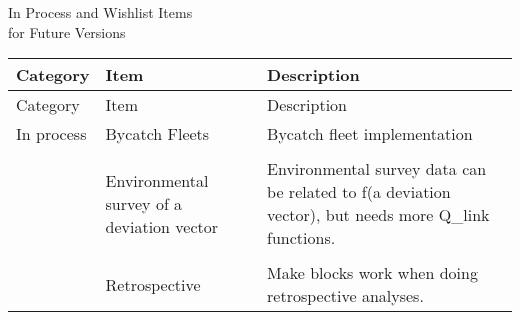 \documentclass[12pt]{article}
\begin{document}
\pagebreak
\begin{center}
	\Large{In Process and Wishlist Items\\
		for Future Versions}\\
\end{center}

\begin{center}
	\begin{longtable}{p{2cm} p{3cm} p{10cm}}
		Category & Item & Description\\
		\hline
		\endfirsthead
		
		Category & Item & Description\\
		\hline
		\endhead
		
		\hline
		\endfoot
		
		\endlastfoot
		
		In process & 
		Bycatch Fleets & Bycatch fleet implementation \\
		\\
		&	Environmental survey of a deviation vector & Environmental survey data can be related to f(a deviation vector), but needs more Q\_link functions.\\
		\\
		& Retrospective & Make blocks work when doing retrospective analyses. \\
		

\end{longtable}
\end{center}
\end{document}

